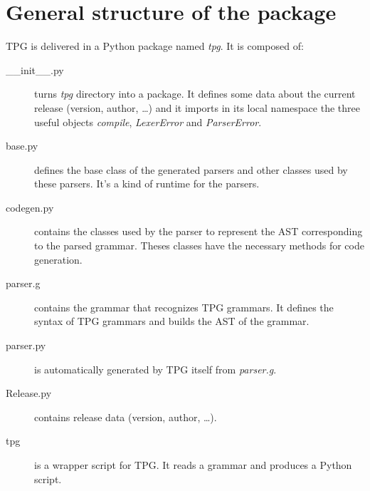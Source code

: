 \section{General structure of the package}

TPG is delivered in a Python package named \emph{tpg}.
It is composed of:

\begin{description}
	\item [\_\_init\_\_.py]
		turns \emph{tpg} directory into a package.
		It defines some data about the current release (version, author, \ldots) and it imports in its local namespace the three useful objects \emph{compile}, \emph{LexerError} and \emph{ParserError}.
	\item [base.py]
		defines the base class of the generated parsers and other classes used by these parsers. It's a kind of runtime for the parsers.
	\item [codegen.py]
		contains the classes used by the parser to represent the AST corresponding to the parsed grammar. Theses classes have the necessary methods for code generation.
	\item [parser.g]
		contains the grammar that recognizes TPG grammars. It defines the syntax of TPG grammars and builds the AST of the grammar.
	\item [parser.py]
		is automatically generated by TPG itself from \emph{parser.g}.
	\item [Release.py]
		contains release data (version, author, \ldots).
	\item [tpg]
		is a wrapper script for TPG.
		It reads a grammar and produces a Python script.
\end{description}
